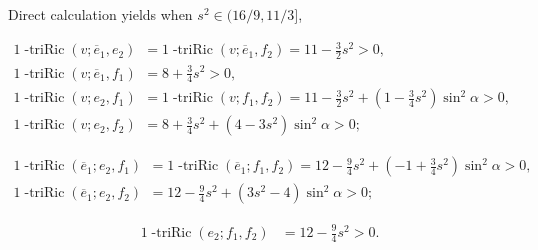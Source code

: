 \documentclass[11pt,letterpaper]{amsart}
\newcommand{\ove}{\overline{e}}
\theoremstyle{definition}
\theoremstyle{remark}
\numberwithin{equation}{section}
\begin{document}
Direct calculation yields when $s^2\in (16/9,11/3]$,

\begin{align*}
    1\operatorname{-triRic}(v;\ove_1,e_2)&=1\operatorname{-triRic}(v;\ove_1,f_2) = 11-\frac{3}{2}s^2>0,\\
    1\operatorname{-triRic}(v;\ove_1,f_1)&=8+\frac{3}{4}s^2>0,\\
    1\operatorname{-triRic}(v;e_2,f_1)&=1\operatorname{-triRic}(v;f_1,f_2)=11-\frac{3}{2}s^2+(1-\frac{3}{4}s^2)\sin^2\alpha>0,\\
    1\operatorname{-triRic}(v;e_2,f_2)&=8+\frac{3}{4}s^2+(4-3s^2)\sin^2\alpha>0;    
\end{align*}



\begin{align*}
    1\operatorname{-triRic}(\ove_1;e_2,f_1)&=1\operatorname{-triRic}(\ove_1;f_1,f_2)=12-\frac{9}{4}s^2+(-1+\frac{3}{4}s^2)\sin^2\alpha>0,\\
    1\operatorname{-triRic}(\ove_1;e_2,f_2)&= 12-\frac{9}{4}s^2+(3s^2-4)\sin^2\alpha>0;
\end{align*}

\begin{align*}
    1\operatorname{-triRic}(e_2;f_1,f_2)&=12-\frac{9}{4}s^2>0.
\end{align*}

\end{document}
